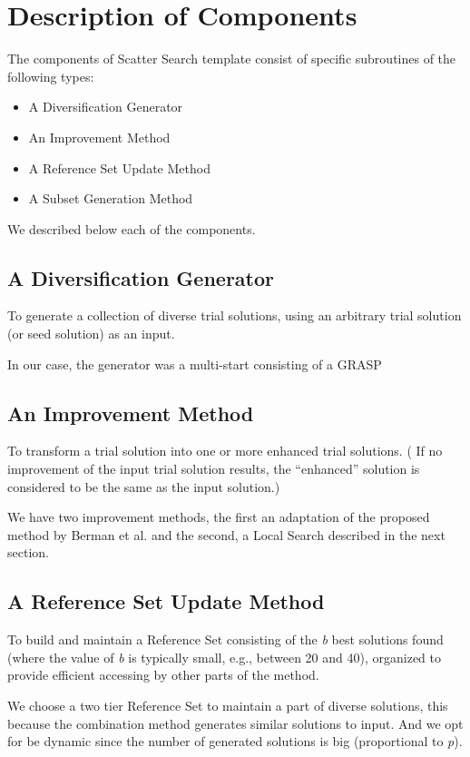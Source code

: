 \section{Description of Components}
The components of Scatter Search template \cite{glover1998template}
consist of
specific subroutines of the following types:
\begin{itemize}
\item A Diversification Generator
\item An Improvement Method
\item A Reference Set Update Method
\item A Subset Generation Method
\end{itemize}
We described below
each of the components.

\subsection{A Diversification Generator}
To generate
a collection of diverse trial solutions,
using an arbitrary trial solution
(or seed solution) as an input.

In our case,
the generator was a multi-start
consisting of a GRASP


\subsection{An Improvement Method}
To transform
a trial solution
into one or more enhanced trial solutions. 
(
If no improvement
of the input trial solution results, 
the ``enhanced'' solution
is considered to be
the same as the input solution.)

We have two improvement methods,
the first an adaptation
of the proposed method by Berman et al. \cite{berman1987stochastic}
and the second,
a Local Search
described in the next section.


\subsection{A Reference Set Update Method}
To build and maintain a Reference Set
consisting of the \textit{b} best solutions found
(where the value of \textit{b}
is typically small,
e.g., between 20 and 40),
organized to provide efficient accessing
by other parts of the method.

We choose
a two tier Reference Set
to maintain a part of diverse solutions,
this because the combination method
generates similar solutions to input.
And we opt for be dynamic
since the number
of generated solutions
is big (proportional to \textit{p}).

